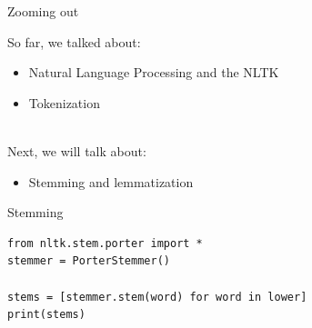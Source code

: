 \documentclass[handout]{beamer}
\begin{document}
\begin{frame}{Zooming out} 
	
So far, we talked about:
\begin{itemize}
	\item Natural Language Processing and the NLTK
	\item Tokenization \\\
\end{itemize}
	
Next, we will talk about:
	\begin{itemize}
		\item Stemming and lemmatization
	\end{itemize}
	
\end{frame}



\begin{frame}[fragile]{Stemming }

\begin{lstlisting}
from nltk.stem.porter import *
stemmer = PorterStemmer()

stems = [stemmer.stem(word) for word in lower]
print(stems)
\end{lstlisting}

\begin{lstlistingoutput}
\end{lstlistingoutput}


\end{frame}
\end{document}
